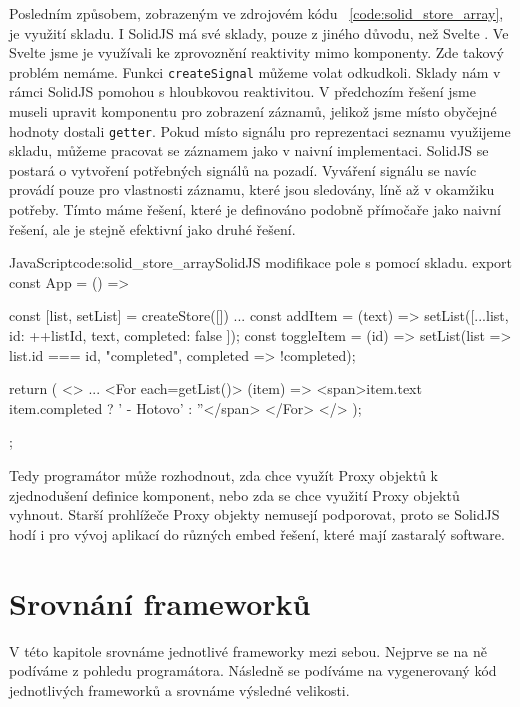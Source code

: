 \documentclass[
  master,
  program=ainf,
  tables=false,
  sourcecodes,
  glossaries,
  index
]{kidiplom}
\begin{document}
Posledním způsobem, zobrazeným ve zdrojovém kódu ~\ref{code:solid_store_array}, je využití skladu. 
I SolidJS \cite{solidjs} má své sklady, pouze z jiného důvodu, než Svelte \cite{svelte}. Ve Svelte \cite{svelte}
jsme je využívali ke zprovoznění reaktivity mimo komponenty. Zde takový problém nemáme. Funkci {\tt createSignal}
můžeme volat odkudkoli. Sklady nám v rámci SolidJS \cite{solidjs} pomohou s hloubkovou reaktivitou. V předchozím řešení 
jsme museli upravit komponentu pro zobrazení záznamů, jelikož jsme místo obyčejné hodnoty dostali {\tt getter}.
Pokud místo signálu pro reprezentaci seznamu využijeme skladu, můžeme pracovat se záznamem jako v naivní
implementaci. SolidJS \cite{solidjs} se postará o vytvoření potřebných signálů na pozadí. Vyváření signálu se navíc provádí
pouze pro vlastnosti záznamu, které jsou sledovány, líně až v okamžiku potřeby. Tímto máme řešení, které
je definováno podobně přímočaře jako naivní řešení, ale je stejně efektivní jako druhé řešení.

\begin{absolutelynopagebreak}
  \begin{kicode}{JavaScript}{code:solid_store_array}{SolidJS modifikace pole s pomocí skladu.}
    export const App = () => {
      const [list, setList] = createStore([])
      ...
      const addItem = (text) => {
        setList([...list, { id: ++listId, text, completed: false }]);
      }
      const toggleItem = (id) => {
        setList(list => list.id === id, "completed", completed => !completed);
      }

      return (
        <>
          ...
          <For each={getList()}>
            {(item) => {<span>{item.text} {item.completed ? ' - Hotovo' : ''</span>} }}
          </For>
        </>
      );
    };
\end{kicode}
\end{absolutelynopagebreak}

Tedy programátor může rozhodnout, zda chce využít Proxy objektů k zjednodušení definice komponent, nebo zda
se chce využití Proxy objektů vyhnout. Starší prohlížeče Proxy objekty nemusejí podporovat, proto se SolidJS \cite{solidjs}
hodí i pro vývoj aplikací do různých embed řešení, které mají zastaralý software.

\newpage
\section{Srovnání frameworků}
V této kapitole srovnáme jednotlivé frameworky mezi sebou. Nejprve se na ně podíváme z pohledu programátora.
Následně se podíváme na vygenerovaný kód jednotlivých frameworků a srovnáme výsledné velikosti.
\end{document}
